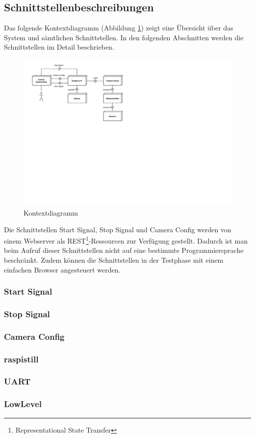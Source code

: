 \subsection{Schnittstellenbeschreibungen}
Das folgende Kontextdiagramm (Abbildung \ref{fig:kontextdiagramm}) zeigt eine Übersicht über das System und sämtlichen Schnittstellen. In den folgenden Abschnitten werden die Schnittstellen im Detail beschrieben.

\begin{figure}[h!]
	\centering
	\includegraphics[width=0.9\linewidth]{../../fig/kontextdiagramm}
	\caption{Kontextdiagramm}
	\label{fig:kontextdiagramm}
\end{figure}

Die Schnittstellen Start Signal, Stop Signal und Camera Config werden von einem Webserver als REST\footnote{Representational State Transfer}-Ressourcen zur Verfügung gestellt. Dadurch ist man beim Aufruf dieser Schnittstellen nicht auf eine bestimmte Programmiersprache beschränkt. Zudem können die Schnittstellen in der Testphase mit einem einfachen Browser angesteuert werden.

\subsubsection{Start Signal}


\subsubsection{Stop Signal}


\subsubsection{Camera Config}


\subsubsection{raspistill}


\subsubsection{UART}


\subsubsection{LowLevel}


